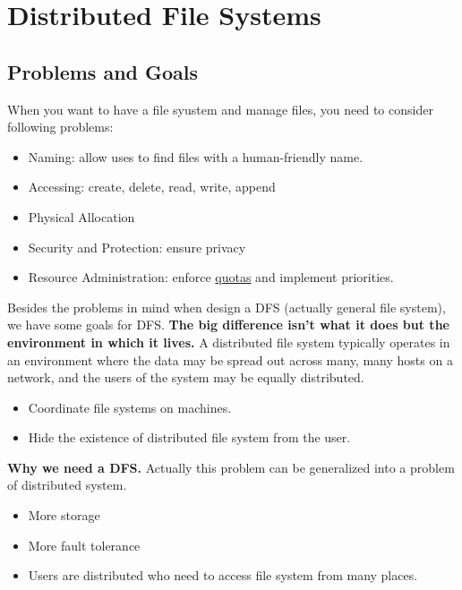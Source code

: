 %
%
%

\chapter{Distributed File Systems}

\section{Problems and Goals}
When you want to have a file syustem and manage files, you need to consider following problems:
\begin{itemize}
    \item Naming: allow uses to find files with a human-friendly name.
    \item Accessing: create, delete, read, write, append
    \item Physical Allocation
    \item Security and Protection: ensure privacy
    \item Resource Administration: enforce \underline{quotas} and implement priorities.
\end{itemize}

Besides the problems in mind when design a DFS (actually general file system), we have some goals for DFS. \textbf{The big difference isn't what it does but the environment in which it lives.} A distributed file system typically operates in an environment where the data may be spread out across many, many hosts on a network, and the users of the system may be equally distributed.
\begin{itemize}
    \item Coordinate file systems on machines.
    \item Hide the existence of distributed file system from the user.
\end{itemize}

\textbf{Why we need a DFS.} Actually this problem can be generalized into a problem of distributed system. 
\begin{itemize}
    \item More storage
    \item More fault tolerance
    \item Users are distributed who need to access file system from many places.
\end{itemize}

